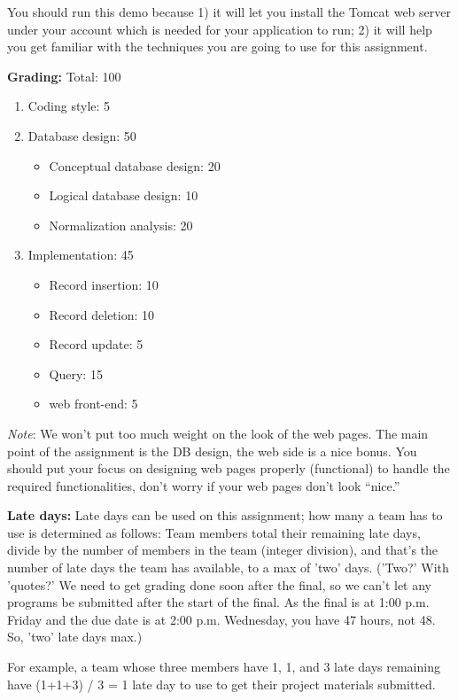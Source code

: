 \documentclass{article}
\begin{document}
You should run this demo because 1) it will let you install
the Tomcat web server under your account which is needed for your
application to run; 2) it
will help you get
familiar with the techniques you are going to use for this assignment.

\textbf{Grading:} Total: 100
\begin{enumerate}
\item Coding style: 5
\item Database design: 50
  \begin{itemize}
  \item Conceptual database design: 20
  \item Logical database design: 10
  \item Normalization analysis: 20
  \end{itemize}
\item Implementation: 45
  \begin{itemize}
  \item Record insertion: 10
  \item Record deletion: 10
  \item Record update: 5
  \item Query: 15
  \item web front-end: 5
  \end{itemize}
\end{enumerate}
\emph{Note}: We won't put too much weight on the look of the web
pages. The main point of the assignment is the DB design, the
web side is a nice bonus. You should put your focus on designing web
pages properly (functional) to handle the required functionalities,
don't worry if your web pages don't look ``nice.''

\textbf{Late days:} Late days can be used on this assignment; how many
a team has to use is determined as follows: Team members total their
remaining late days, divide by the number of members in the team
(integer division), and that's the number of late days the team has
available, to a max of 'two' days.  ('Two?'  With 'quotes?'  We need
to get grading done soon after the final, so we can't let any programs
be submitted after the start of the final.  As the final is at 1:00
p.m. Friday and the due date is at 2:00 p.m. Wednesday, you have 47
hours, not 48.  So, 'two' late days max.)

For example, a team whose three members have 1, 1, and 3 late days
remaining have (1+1+3) / 3 = 1 late day to use to get their project
materials submitted.
\end{document}
